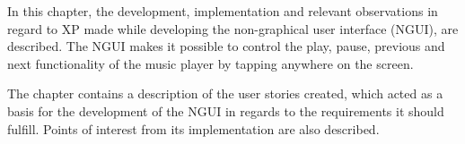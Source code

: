 In this chapter, the development, implementation and relevant observations in regard to XP made while developing the non-graphical user interface (NGUI), are described. The NGUI makes it possible to control the play, pause, previous and next functionality of the music player by tapping anywhere on the screen.

The chapter contains a description of the user stories created, which acted as a basis for the development of the NGUI in regards to the requirements it should fulfill. Points of interest from its implementation are also described.